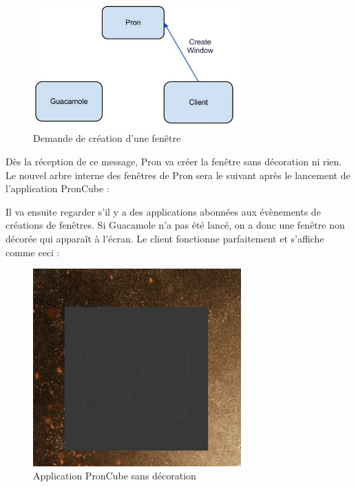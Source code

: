 \begin{figure}[H]
  \centering
  \includegraphics[width=8cm]{images/Guacamole_anim_2.jpg}
  \caption{Demande de création d'une fenêtre}
  \label{fig:guacamole_anim_2}
\end{figure}

Dès la réception de ce message, Pron va créer la fenêtre sans décoration ni rien.
Le nouvel arbre interne des fenêtres de Pron sera le suivant après le lancement de l'application PronCube :

\begin{center}
\end{center}

Il va ensuite regarder s'il y a des applications abonnées aux évènements de créations de fenêtres.
Si Guacamole n'a pas été lancé, on a donc une fenêtre non décorée qui apparaît à l'écran.
Le client fonctionne parfaitement et s'affiche comme ceci :

\begin{figure}[H]
  \centering
  \includegraphics[width=8cm]{images/pron_cube_sans_decoration.jpg}
  \caption{Application PronCube sans décoration}
  \label{fig:pron_cube_sans_decoration}
\end{figure}

